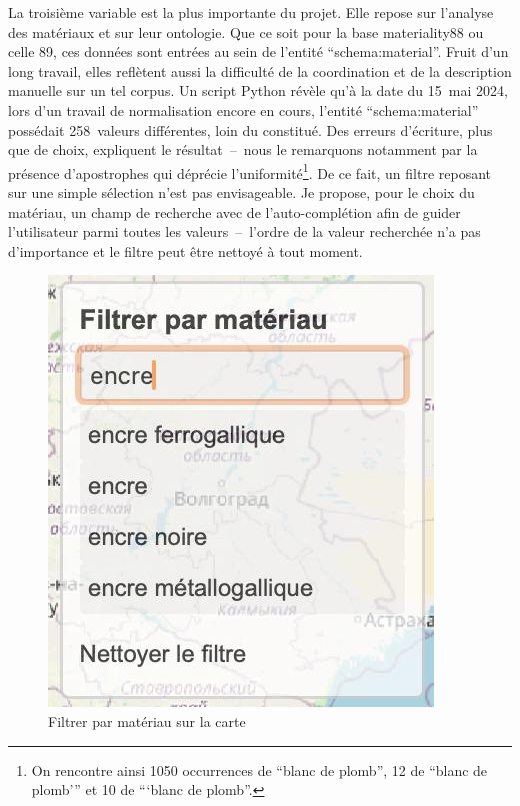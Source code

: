 La troisième variable est la plus importante du projet. Elle repose sur l’analyse des matériaux et sur leur ontologie. Que ce soit pour la base materiality88 ou celle 89, ces données sont entrées au sein de l’entité \enquote{schema:material}. Fruit d’un long travail, elles reflètent aussi la difficulté de la coordination et de la description manuelle sur un tel corpus. Un script Python révèle qu’à la date du 15~mai 2024, lors d’un travail de normalisation encore en cours, l’entité \enquote{schema:material} possédait 258~valeurs différentes, loin du  constitué. Des erreurs d’écriture, plus que de choix, expliquent le résultat~–~nous le remarquons notamment par la présence d’apostrophes qui déprécie l’uniformité\footnote{On rencontre ainsi 1050 occurrences de \enquote{blanc de plomb}, 12 de \enquote{blanc de plomb’} et 10 de \enquote{‘blanc de plomb}.}. De ce fait, un filtre reposant sur une simple sélection n’est pas envisageable. Je propose, pour le choix du matériau, un champ de recherche avec de l’auto-complétion afin de guider l’utilisateur parmi toutes les valeurs~–~l’ordre de la valeur recherchée n’a pas d’importance et le filtre peut être nettoyé à tout moment.\par

\begin{figure}[H]
	\centering
	\includegraphics[scale=0.3]{./textes/chap2/filtre-materiaux.jpg}
	\caption{Filtrer par matériau sur la carte}
	\label{fig:info}
\end{figure}

